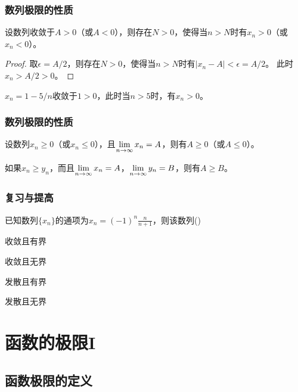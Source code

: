\documentclass[14pt,notheorems,leqno,xcolor={rgb}]{beamer} %
\begin{document}
\begin{iframe}
\frametitle{数列极限的性质}
\begin{property}[保号性]
设数列收敛于$A>0$（或$A<0$），则存在$N>0$，使得当$n>N$时有$x_n>0$（或$x_n<0$）。
\end{property}
\vpause
\begin{proof}
取$\epsilon=A/2$，则存在$N>0$，使得当$n>N$时有$|x_n-A|<\epsilon=A/2$。
此时$x_n>A/2>0$。
\end{proof}
\vpause
\begin{example*}
$x_n=1-5/n$收敛于$1>0$，此时当$n>5$时，有$x_n>0$。
\end{example*}
\end{iframe}

\begin{frame}
\frametitle{数列极限的性质}
\begin{theorem*}[保号性]
设数列$x_n\ge0$（或$x_n\le0$），且$\lim\limits_{n\to\infty}x_n=A$，则有$A\ge0$（或$A\le0$）。
\end{theorem*}
\vpause
\begin{corollary*}
如果$x_n\ge y_n$，而且$\lim\limits_{n\to\infty}x_n=A$，$\lim\limits_{n\to\infty}y_n=B$，则有$A\ge B$。
\end{corollary*}
\end{frame}

\begin{frame}
\frametitle{复习与提高}
\begin{choice}
已知数列$\{x_n\}$的通项为$x_n=(-1)^n\frac{n}{n+1}$，则该数列\dotfill()
\begin{choicehalf}
  \item 收敛且有界 ~
  \item 收敛且无界 ~
  \item 发散且有界 ~
  \item 发散且无界 ~
\end{choicehalf}
\end{choice}
\end{frame}

\section{函数的极限I}

\subsection{函数极限的定义}
\end{document}
